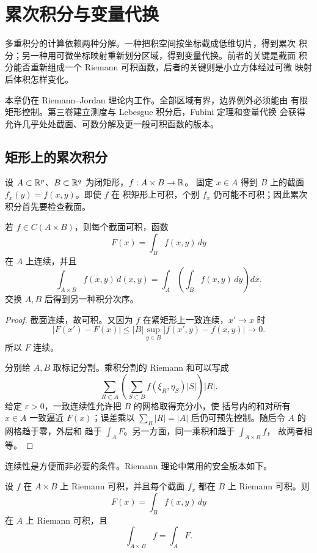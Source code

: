 \chapter{累次积分与变量代换}
\label{chap:fubini-change-variables}

多重积分的计算依赖两种分解。一种把积空间按坐标截成低维切片，得到累次
积分；另一种用可微坐标映射重新划分区域，得到变量代换。前者的关键是截面
积分能否重新组成一个 Riemann 可积函数，后者的关键则是小立方体经过可微
映射后体积怎样变化。

本章仍在 Riemann--Jordan 理论内工作。全部区域有界，边界例外必须能由
有限矩形控制。第三卷建立测度与 Lebesgue 积分后，Fubini 定理和变量代换
会获得允许几乎处处截面、可数分解及更一般可积函数的版本。

\section{矩形上的累次积分}

设 \(A\subset\mathbb{R}^p\)、\(B\subset\mathbb{R}^q\) 为闭矩形，\(f:A\times B\to\mathbb{R}\)。
固定 \(x\in A\) 得到 \(B\) 上的截面 \(f_x(y)=f(x,y)\)。即使 \(f\) 在
积矩形上可积，个别 \(f_x\) 仍可能不可积；因此累次积分首先要检查截面。

\begin{theorem}
\label{thm:fubini-continuous-rectangles}
若 \(f\in C(A\times B)\)，则每个截面可积，函数
\[
 F(x)=\int_B f(x,y)\,dy
\]
在 \(A\) 上连续，并且
\[
 \int_{A\times B}f(x,y)\,d(x,y)
 =\int_A\left(\int_Bf(x,y)\,dy\right)dx.
\]
交换 \(A,B\) 后得到另一种积分次序。
\end{theorem}

\begin{proof}
截面连续，故可积。又因为 \(f\) 在紧矩形上一致连续，\(x'\to x\) 时
\[
 |F(x')-F(x)|
 \le |B|\sup_{y\in B}|f(x',y)-f(x,y)|\longrightarrow0.
\]
所以 \(F\) 连续。

分别给 \(A,B\) 取标记分割。乘积分割的 Riemann 和可以写成
\[
 \sum_{R\subset A}
 \left(\sum_{S\subset B}f(\xi_R,\eta_S)|S|\right)|R|.
\]
给定 \(\varepsilon>0\)，一致连续性允许把 \(B\) 的网格取得充分小，使
括号内的和对所有 \(x\in A\) 一致逼近 \(F(x)\)；误差乘以
\(\sum_R|R|=|A|\) 后仍可预先控制。随后令 \(A\) 的网格趋于零，外层和
趋于 \(\int_AF\)。另一方面，同一乘积和趋于 \(\int_{A\times B}f\)，
故两者相等。
\end{proof}

连续性是方便而非必要的条件。Riemann 理论中常用的安全版本如下。

\begin{theorem}
\label{thm:fubini-riemann-all-sections}
设 \(f\) 在 \(A\times B\) 上 Riemann 可积，并且每个截面 \(f_x\) 都在
\(B\) 上 Riemann 可积。则
\[
 F(x)=\int_Bf(x,y)\,dy
\]
在 \(A\) 上 Riemann 可积，且
\[
 \int_{A\times B}f=\int_AF.
\]
\end{theorem}

